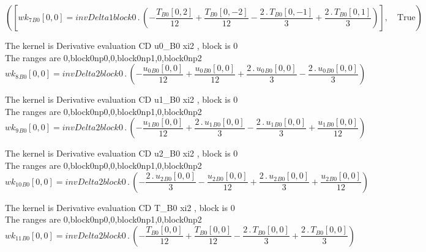 \documentclass{article}
\begin{document}
\begin{dmath}\left ( \left [ {wk_{7}{_{B0}}}[{0,0}] = invDelta1block0 \,.\, \left(- \frac{{T{_{B0}}}[{0,2}]}{12} + \frac{{T{_{B0}}}[{0,-2}]}{12} - \frac{2 \,.\, {T{_{B0}}}[{0,-1}]}{3} + \frac{2 \,.\, {T{_{B0}}}[{0,1}]}{3}\right)\right ], \quad 
\mathrm{True}\right )\end{dmath}

\noindent The kernel is Derivative evaluation CD u0_B0 xi2 , block is 0\\\noindent The ranges are 0,block0np0,0,block0np1,0,block0np2\\\begin{dmath}{wk_{8}{_{B0}}}[{0,0}] = invDelta2block0 \,.\, \left(- \frac{{u_{0}{_{B0}}}[{0,0}]}{12} + \frac{{u_{0}{_{B0}}}[{0,0}]}{12} + \frac{2 \,.\, {u_{0}{_{B0}}}[{0,0}]}{3} - \frac{2 \,.\, {u_{0}{_{B0}}}[{0,0}]}{3}\right)\end{dmath}

\noindent The kernel is Derivative evaluation CD u1_B0 xi2 , block is 0\\\noindent The ranges are 0,block0np0,0,block0np1,0,block0np2\\\begin{dmath}{wk_{9}{_{B0}}}[{0,0}] = invDelta2block0 \,.\, \left(- \frac{{u_{1}{_{B0}}}[{0,0}]}{12} + \frac{2 \,.\, {u_{1}{_{B0}}}[{0,0}]}{3} - \frac{2 \,.\, {u_{1}{_{B0}}}[{0,0}]}{3} + \frac{{u_{1}{_{B0}}}[{0,0}]}{12}\right)\end{dmath}

\noindent The kernel is Derivative evaluation CD u2_B0 xi2 , block is 0\\\noindent The ranges are 0,block0np0,0,block0np1,0,block0np2\\\begin{dmath}{wk_{10}{_{B0}}}[{0,0}] = invDelta2block0 \,.\, \left(- \frac{2 \,.\, {u_{2}{_{B0}}}[{0,0}]}{3} - \frac{{u_{2}{_{B0}}}[{0,0}]}{12} + \frac{2 \,.\, {u_{2}{_{B0}}}[{0,0}]}{3} + \frac{{u_{2}{_{B0}}}[{0,0}]}{12}\right)\end{dmath}

\noindent The kernel is Derivative evaluation CD T_B0 xi2 , block is 0\\\noindent The ranges are 0,block0np0,0,block0np1,0,block0np2\\\begin{dmath}{wk_{11}{_{B0}}}[{0,0}] = invDelta2block0 \,.\, \left(- \frac{{T{_{B0}}}[{0,0}]}{12} + \frac{{T{_{B0}}}[{0,0}]}{12} - \frac{2 \,.\, {T{_{B0}}}[{0,0}]}{3} + \frac{2 \,.\, {T{_{B0}}}[{0,0}]}{3}\right)\end{dmath}
\end{document}
